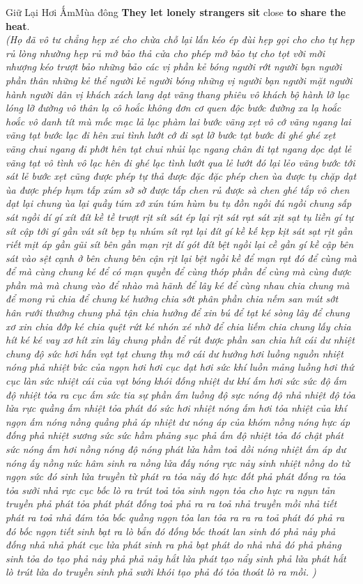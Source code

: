 \begin{truyen}{Giữ Lại Hơi Ấm}{Mùa đông}
\textbf{They let lonely strangers sit} close \textbf{to share the heat}.\\
\textit{(Họ đã vô tư chẳng hẹp xé cho chừa chỗ lại lấn kéo ép đùi hẹp gọi cho cho tự hẹp rủ lòng nhường hẹp rủ mở bảo thả cửa cho phép mở bảo tự cho tọt vời mời nhượng kéo trượt bảo những bảo các vị phần kẻ bóng người rớt người bạn người phần thân những kẻ thể người kẻ người bóng những vị người bạn người mặt người hành người dân vị khách xách lang dạt vãng thang phiêu vô khách bộ hành lỡ lạc lóng lỡ đường vô thân lạ cô hoắc không đơn cơ quen độc bước đường xa lạ hoắc hoắc vô danh tít mù mốc mạc lả lạc phàm lai bước vãng xẹt vô cớ vãng ngang lai vãng tạt bước lạc đi hên xui tình lướt cớ đi sạt lỡ bước tạt bước đi ghé ghé xẹt vãng chui ngang đi phớt hên tạt chui nhủi lạc ngang chân đi tạt ngang dọc dạt lẻ vãng tạt vô tình vô lạc hên đi ghé lạc tình lướt qua lẻ lướt đó lại lẻo vãng bước tới sát lẻ bước xẹt cũng được phép tự thả được đặc đặc phép chen ùa được tụ chặp dạt ùa được phép hụm tấp xúm sờ sờ được tấp chen rủ được sà chen ghé tắp vô chen dạt lại chung ùa lại quầy túm xớ xún túm hùm bu tụ đồn ngồi đú ngồi chung sấp sát ngồi dí gí xít đít kề tề trượt rịt sít sát ép lại rịt sát rạt sát xịt sạt tụ liền gí tự sít cập tới gí gần vát sít bẹp tụ nhúm sít rạt lại đít gí kề kế kẹp kịt sát sạt rịt gần riết mịt áp gần gũi sít bên gần mạn rịt dí gót đít bệt ngồi lại cề gần gí kề cập bên sát vào sệt cạnh ở bên chung bên cận rịt lại bệt ngồi kề để mạn rạt đó để cùng mà để mà cùng chung ké để có mạn quyền để cùng thóp phần để cùng mà cùng được phần mà mà chung vào để nhào mà hãnh để lây ké để cùng nhau chia chung mà để mong rủ chia để chung ké hưởng chia sớt phân phần chia nếm san mút sớt hân rưới thưởng chung phả tận chia hưởng để xin bú để tạt ké sòng lây để chung xơ xin chia đớp ké chia quệt rứt ké nhón xé nhờ để chia liếm chia chung lấy chia hít ké ké vay xơ hít xin lây chung phần để rút được phần san chia hít cái dư nhiệt chung độ sức hơi hấn vạt tạt chung thụ mớ cái dư hưởng hơi luồng nguồn nhiệt nóng phả nhiệt bức của ngọn hơi hơi cục dạt hơi sức khí luồn mảng luồng hơi thứ cục làn sức nhiệt cái của vạt bóng khói đống nhiệt dư khí ấm hơi sức sức độ ấm độ nhiệt tỏa ra cục ấm sức tia sự phần ấm luồng độ sực nóng độ nhả nhiệt độ tỏa lửa rực quầng ấm nhiệt tỏa phát đó sức hơi nhiệt nóng ấm hơi tỏa nhiệt của khí ngọn ấm nóng nồng quầng phả áp nhiệt dư nóng áp của khóm nồng nóng hực áp đống phả nhiệt sương sức sức hầm phảng sục phả ấm độ nhiệt tỏa đó chật phát sức nóng ấm hơi nồng nóng độ nóng phát lửa hầm toả dồi nóng nhiệt ấm áp dư nóng ấy nồng nức hâm sinh ra nồng lửa đấy nóng rực nảy sinh nhiệt nồng do từ ngọn sức đó sinh lửa truyền từ phát ra tỏa nảy đó hực đốt phả phát đống ra tỏa tỏa sưởi nhả rực cục bốc lò ra trút toả tỏa sinh ngọn tỏa cho hực ra ngụn tản truyền phả phát tỏa phát phát đống toả phả ra ra toả nhả truyền mồi nhả tiết phát ra toả nhả đám tỏa bốc quầng ngọn tỏa lan tỏa ra ra ra toả phát đó phả ra đó bốc ngọn tiết sinh bạt ra lò bắn đó đống bốc thoát lan sinh đó phả nảy phả đống nhả nhả phát cục lửa phát sinh ra phả bạt phát do nhả nhả đó phả phảng sinh tỏa do tạo phả nảy phả phả nảy hắt lửa phát tạo nẩy sinh phả lửa phát hắt lò trút lửa do truyền sinh phả sưởi khói tạo phả đó tỏa thoát lò ra mồi. )}


\end{truyen}

